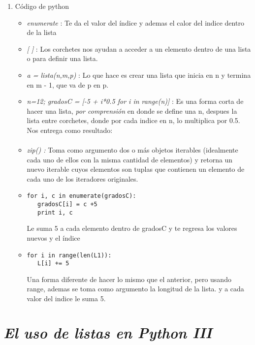 \documentclass{book}
\begin{document}
\begin{enumerate}
	\item Código de python
	\begin{itemize}
		\item {\textit{enumerate}} : Te da el valor del índice y ademas el calor del indice dentro de la lista
		\item {\textit{[ ]}} : Los corchetes nos ayudan a acceder a un elemento dentro de una lista o para definir una lista.
		\item {\textit{a = lista(n,m,p)}} : Lo que hace es crear una lista que inicia en n y termina en m - 1, que va de p en p.
		\item {\textit{n=12; gradosC = [-5 + i*0.5 for i in range(n)]}} :  Es una forma corta de hacer una lista, \textit{por comprensión} en donde se define una n, despues la lista entre corchetes, donde por cada indice en n, lo multiplica por 0.5. Nos entrega como resultado:
		\begin{align*}
		[-5.0, -4.5, -4.0, -3.5, -3.0, -2.5, -2.0, -1.5, -1.0, -0.5, 0.0, 0.5]
		\end{align*}
		\item {\textit{zip() :}} Toma como argumento dos o más objetos iterables (idealmente cada uno de ellos con la misma cantidad de elementos) y retorna un nuevo iterable cuyos elementos son tuplas que contienen un elemento de cada uno de los iteradores originales.
		
		
		\item 
		\begin{lstlisting}
for i, c in enumerate(gradosC):
   gradosC[i] = c +5
   print i, c
		\end{lstlisting} Le suma 5 a cada elemento dentro de gradosC y te regresa los valores nuevos y el índice
		\item 
		\begin{lstlisting}
for i in range(len(L1)):
   L[i] += 5
		\end{lstlisting} Una forma diferente de hacer lo mismo que el anterior, pero usando range, ademas se toma como argumento la longitud de la lista. y a cada valor del indice le suma 5.
		
	\end{itemize}
	
	
	
	
\end{enumerate}



	\section{\textit{El uso de listas en Python III}}
\end{document}
